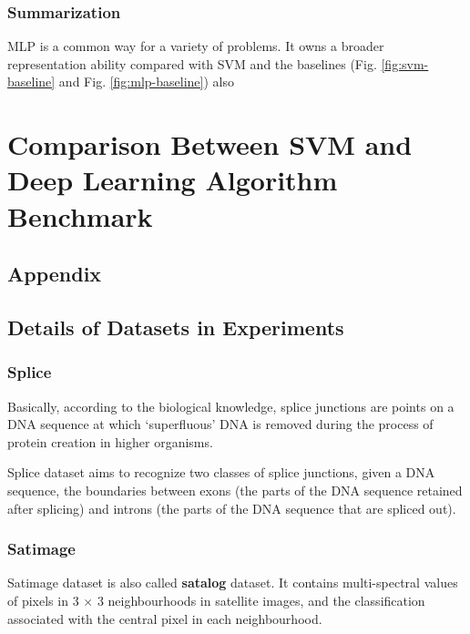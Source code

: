\documentclass[12pt,a4paper]{article}
\theoremstyle{definition}
\begin{document}
\subsubsection{Summarization}

MLP is a common way for a variety of problems. It owns a broader representation ability compared with SVM and the baselines (Fig. \ref{fig:svm-baseline} and Fig. \ref{fig:mlp-baseline}) also 

\section{Comparison Between SVM and Deep Learning Algorithm Benchmark}

\newpage
\begin{appendix}
\section{Appendix}

\subsection{Details of Datasets in Experiments}
\label{apd:dataset}

\subsubsection{Splice \cite{splice}}

Basically, according to the biological knowledge, splice junctions are points on a DNA sequence at which `superfluous' DNA is removed during the process of protein creation in higher organisms.

\vspace{0.01\linewidth}
Splice dataset aims to recognize two classes of splice junctions, given a DNA sequence, the boundaries between exons (the parts of the DNA sequence retained after splicing) and introns (the parts of the DNA sequence that are spliced out).

\subsubsection{Satimage \cite{satimage}}

Satimage dataset is also called \textbf{satalog} dataset. It contains multi-spectral values of pixels in 3 $\times$ 3 neighbourhoods in satellite images, and the classification associated with the central pixel in each neighbourhood.


\end{appendix}
\end{document}
